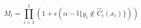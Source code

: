 \begin{theorem}
\begin{equation}
  M_t = \prod_{i=1}^{t} \left(1 + \epsilon (\alpha - \mathbb{I}\{y_i \notin \hat{C}_i(x_i)\})\right)
\end{equation}
\end{theorem}
